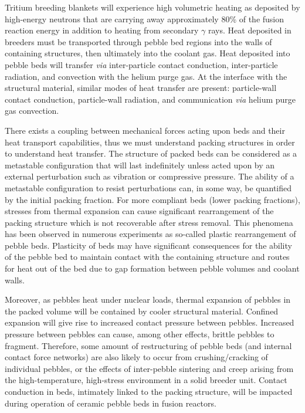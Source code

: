 
Tritium breeding blankets will experience high volumetric heating as deposited by high-energy neutrons that are carrying away approximately 80\% of the fusion reaction energy in addition to heating from secondary $\gamma$ rays. Heat deposited in breeders must be transported through pebble bed regions into the walls of containing structures, then ultimately into the coolant gas. Heat deposited into pebble beds will transfer \textit{via} inter-particle contact conduction, inter-particle radiation, and convection with the helium purge gas. At the interface with the structural material, similar modes of heat transfer are present: particle-wall contact conduction, particle-wall radiation, and communication \textit{via} helium purge gas convection. 

There exists a coupling between mechanical forces acting upon beds and their heat transport capabilities, thus we must understand packing structures in order to understand heat transfer. The structure of packed beds can be considered as a metastable configuration that will last indefinitely unless acted upon by an external perturbation such as vibration or compressive pressure.\cite{Jaeger1996} The ability of a metastable configuration to resist perturbations can, in some way, be quantified by the initial packing fraction. For more compliant beds (lower packing fractions), stresses from thermal expansion can cause significant rearrangement of the packing structure which is not recoverable after stress removal. This phenomena has been observed in numerous experiments as so-called plastic rearrangement of pebble beds.\cite{Reimann:2002kl,Reimann:2000tw,Zhang2015} Plasticity of beds may have significant consequences for the ability of the pebble bed to maintain contact with the containing structure and routes for heat out of the bed due to gap formation between pebble volumes and coolant walls. 

Moreover, as pebbles heat under nuclear loads, thermal expansion of pebbles in the packed volume will be contained by cooler structural material. Confined expansion will give rise to increased contact pressure between pebbles. Increased pressure between pebbles can cause, among other effects, brittle pebbles to fragment. Therefore, some amount of restructuring of pebble beds (and internal contact force networks) are also likely to occur from crushing/cracking of individual pebbles, or the effects of inter-pebble sintering and creep arising from the high-temperature, high-stress environment in a solid breeder unit. Contact conduction in beds, intimately linked to the packing structure, will be impacted during operation of ceramic pebble beds in fusion reactors.

